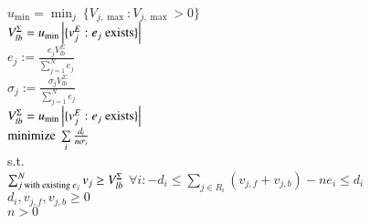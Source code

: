 \begin{AlgFloat}[H]
\begin{Algorithm}[FALCON]
\label{alg:FALCON}
\begin{algorithmic}
~\\
$u_{\min} = \min_j\ \{V_{j,\max} : V_{j,\max} > 0\}$\\
$V_{lb}^{\Sigma} = u_{\min} \left|\{v_j^E : e_j \textnormal{ exists}\}\right|$\\
  \STATE $e_j := \frac{e_j V_{lb}^{\Sigma}}
    {\sum\nolimits_{j=1}^N e_j}$\\ 
  \STATE $\sigma_j := \frac{\sigma_j V_{lb}^{\Sigma}}
    {\sum\nolimits_{j=1}^N e_j}$\\ 
\ENDFOR
{}
  \STATE $V_{lb}^{\Sigma} = u_{\min} \left|\{v_j^E : 
    e_j \textnormal{ exists}\}\right|$\\
  \INDSTATE $\textnormal{minimize}\ \sum\limits_i \frac{d_i}{n
    \sigma_i}$ \\
  \INDSTATE s.t. \\
  \INDSTATE $\sum_{j \textnormal{ with existing\ } e_j}^N v_j \geq V_{lb}^{\Sigma}$ 
  \INDSTATE $\forall i: -d_i \leq \sum\nolimits_{j \in R_i} (v_{j,f} +
    v_{j,b}) - n e_i \leq d_i$ \\
  \INDSTATE $d_i, v_{j,f}, v_{j,b} \geq 0$ \\
  \INDSTATE $n > 0$
  \ENDFOR
\ENDWHILE
\end{algorithmic}
\end{Algorithm}
\end{AlgFloat}



